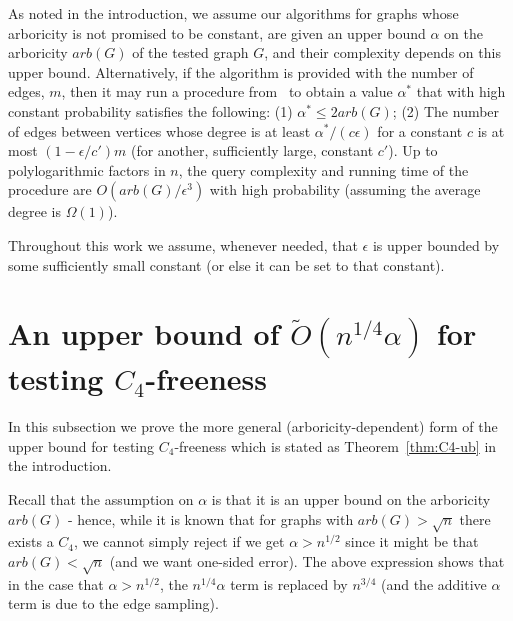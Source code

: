 \documentclass{article}
\newcommand{\eps}{\epsilon}
\newcommand{\commentt}[1]{ {}}
\newcommand{\ICALPCR}[1]{{#1}}
\begin{document}
As noted in the introduction, we assume our algorithms for graphs whose arboricity is not promised to be constant,  are given an upper bound $\alpha$ on the arboricity $arb(G)$ of the tested  graph $G$, and their complexity depends on this upper bound. Alternatively, if the algorithm is provided with the number of edges, $m$, then it may run a procedure from~\cite{Reut} to obtain a value $\alpha^*$ that with high constant probability satisfies the following: (1) $\alpha^* \leq 2arb(G)$; (2) The number of edges between vertices whose degree is at least $\alpha^*/(c\eps)$ for a constant $c$ is at most $(1-\eps/c')m$ (for another, sufficiently large, constant $c'$).
Up to polylogarithmic factors in $n$, the query complexity and running time of the procedure are $O(arb(G)/\eps^3)$ with high probability (assuming the average degree is $\Omega(1)$). 


Throughout this work we assume, whenever needed, that $\epsilon$ is upper bounded by some sufficiently small constant (or else it can be set to that constant).





\section{An upper bound of $\widetilde{O}(n^{1/4} \alpha)$ for testing $C_4$-freeness}\label{subsec:C4-ub}
\label{sec:C4}




\ICALPCR{In this subsection we prove the more general (arboricity-dependent) form of the upper bound for testing $C_4$-freeness which is stated as Theorem~\ref{thm:C4-ub} in the introduction.}


Recall that the assumption on $\alpha$ is that it is an upper bound on the arboricity $arb(G)$ - hence, while it is known that for graphs with $arb(G)>\sqrt{n}$ there exists a $C_4$,  we cannot simply reject if we get $\alpha>n^{1/2}$ since it might be that $arb(G)<\sqrt{n}$ (and we want one-sided error). 
The above expression shows that in the  case that $\alpha>n^{1/2}$, the $n^{1/4}\alpha$ term is replaced by $n^{3/4}$ (and the additive $\alpha$ term is due to the edge sampling).
\end{document}
